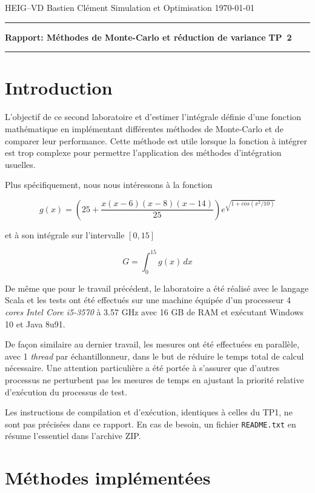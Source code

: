 \documentclass[a4paper,11pt]{article}
\begin{document}
	
{\sc HEIG--VD} \hfill Bastien Clément\newline 
Simulation et Optimisation \hfill \today \newline
\hrule
\vspace{2mm}
{\large \bf Rapport: Méthodes de Monte-Carlo et réduction de variance} \hfill {\large \bf TP~2}
\vspace{4mm}
\hrule

\tableofcontents

\section{Introduction}

L'objectif de ce second laboratoire et d'estimer l'intégrale définie d'une fonction mathématique en implémentant différentes méthodes de Monte-Carlo et de comparer leur performance. Cette méthode est utile lorsque la fonction à intégrer est trop complexe pour permettre l'application des méthodes d'intégration usuelles.

Plus spécifiquement, nous nous intéressons à la fonction

\[
	g(x) = \left( 25 + \frac{x(x-6)(x-8)(x-14)}{25} \right) e^{\sqrt{1+cos(x^2/10)}}
\]

et à son intégrale sur l'intervalle $[0,15]$

\[
	G = \int_{0}^{15} g(x) \,dx
\]

De même que pour le travail précédent, le laboratoire a été réalisé avec le langage Scala et les tests ont été effectués sur une machine équipée d'un processeur 4 \emph{cores} \emph{Intel Core i5-3570} à 3.57 GHz avec 16 GB de RAM et exécutant Windows 10 et Java 8u91.

De façon similaire au dernier travail, les mesures ont été effectuées en parallèle, avec 1 \emph{thread} par échantillonneur, dans le but de réduire le temps total de calcul nécessaire. Une attention particulière a été portée à s'assurer que d'autres processus ne perturbent pas les mesures de temps en ajustant la priorité relative d'exécution du processus de test.

Les instructions de compilation et d'exécution, identiques à celles du TP1, ne sont pas précisées dans ce rapport. En cas de besoin, un fichier \texttt{README.txt} en résume l'essentiel dans l'archive ZIP.

\section{Méthodes implémentées}
\end{document}
